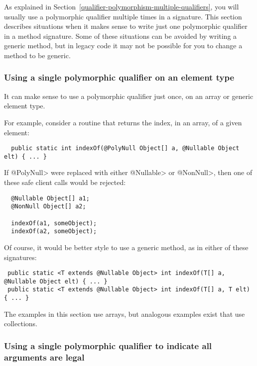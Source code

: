 As explained in Section~\ref{qualifier-polymorphism-multiple-qualifiers},
you will usually use a polymorphic qualifier
multiple times in a signature.
This section describes situations when it makes sense to write just one
polymorphic qualifier in a method signature.
Some of these situations can be avoided by writing a generic method,
but in legacy code it may not be possible for you to change a method to be
generic.


\subsubsection{Using a single polymorphic qualifier on an element type\label{qualifier-polymorphism-element-types}}

It can make sense to use a polymorphic qualifier just once, on an array or
generic element type.

For example, consider a routine that returns the index, in an array, of a
given element:

\begin{Verbatim}
  public static int indexOf(@PolyNull Object[] a, @Nullable Object elt) { ... }
\end{Verbatim}

If \<@PolyNull> were replaced with either \<@Nullable> or \<@NonNull>, then
one of these safe client calls would be rejected:

\begin{Verbatim}
  @Nullable Object[] a1;
  @NonNull Object[] a2;

  indexOf(a1, someObject);
  indexOf(a2, someObject);
\end{Verbatim}

Of course, it would be better style to use a generic method, as in either
of these signatures:

\begin{Verbatim}
 public static <T extends @Nullable Object> int indexOf(T[] a, @Nullable Object elt) { ... }
 public static <T extends @Nullable Object> int indexOf(T[] a, T elt) { ... }
\end{Verbatim}

The examples in this section use arrays, but analogous examples exist that
use collections.


\subsubsection{Using a single polymorphic qualifier to indicate all arguments are legal\label{qualifier-polymorphism-top-type}}

